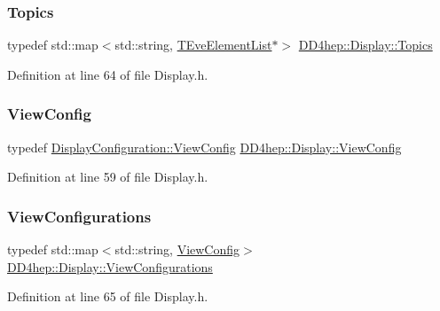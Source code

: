 \subsubsection{\texorpdfstring{Topics}{Topics}}
{\footnotesize\ttfamily typedef std\+::map$<$std\+::string, \hyperlink{class_t_eve_element_list}{T\+Eve\+Element\+List}$\ast$$>$ \hyperlink{class_d_d4hep_1_1_display_ab7cf442eb2211f57f55b7cd1cf8a61c1}{D\+D4hep\+::\+Display\+::\+Topics}}



Definition at line 64 of file Display.\+h.

\hypertarget{class_d_d4hep_1_1_display_a7be76e4de32d9d1084a6ca2f52669f68}{}\label{class_d_d4hep_1_1_display_a7be76e4de32d9d1084a6ca2f52669f68} 
\subsubsection{\texorpdfstring{View\+Config}{ViewConfig}}
{\footnotesize\ttfamily typedef \hyperlink{class_d_d4hep_1_1_display_configuration_1_1_view_config}{Display\+Configuration\+::\+View\+Config} \hyperlink{class_d_d4hep_1_1_display_a7be76e4de32d9d1084a6ca2f52669f68}{D\+D4hep\+::\+Display\+::\+View\+Config}}



Definition at line 59 of file Display.\+h.

\hypertarget{class_d_d4hep_1_1_display_a1bb7fbc1eeb22ef2b1cea35c78e9d27a}{}\label{class_d_d4hep_1_1_display_a1bb7fbc1eeb22ef2b1cea35c78e9d27a} 
\subsubsection{\texorpdfstring{View\+Configurations}{ViewConfigurations}}
{\footnotesize\ttfamily typedef std\+::map$<$std\+::string, \hyperlink{class_d_d4hep_1_1_display_a7be76e4de32d9d1084a6ca2f52669f68}{View\+Config}$>$ \hyperlink{class_d_d4hep_1_1_display_a1bb7fbc1eeb22ef2b1cea35c78e9d27a}{D\+D4hep\+::\+Display\+::\+View\+Configurations}}



Definition at line 65 of file Display.\+h.

\hypertarget{class_d_d4hep_1_1_display_a93fcdf6ec0390291e26d59d0d78cd6e8}{}\label{class_d_d4hep_1_1_display_a93fcdf6ec0390291e26d59d0d78cd6e8} 
